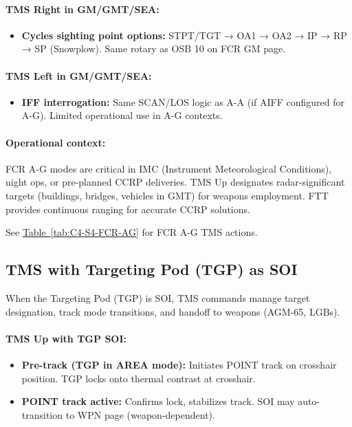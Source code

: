 \documentclass[11pt, a4paper, twoside]{report}
\newcommand{\tabref}[1]{\hyperref[#1]{Table~\ref*{#1}}}
\begin{document}
\paragraph{TMS Right in GM/GMT/SEA:}
\begin{itemize}
    \item \textbf{Cycles sighting point options:} STPT/TGT → OA1 → OA2 → IP → RP → SP (Snowplow). Same rotary as OSB 10 on FCR GM page.
\end{itemize}

\paragraph{TMS Left in GM/GMT/SEA:}
\begin{itemize}
    \item \textbf{IFF interrogation:} Same SCAN/LOS logic as A-A (if AIFF configured for A-G). Limited operational use in A-G contexts.
\end{itemize}

\paragraph{Operational context:}
FCR A-G modes are critical in IMC (Instrument Meteorological Conditions), night ops, or pre-planned CCRP deliveries. TMS Up designates radar-significant targets (buildings, bridges, vehicles in GMT) for weapons employment. FTT provides continuous ranging for accurate CCRP solutions.

See \tabref{tab:C4-S4-FCR-AG} for FCR A-G TMS actions.

\subsection{TMS with Targeting Pod (TGP) as SOI}
\label{sec:C4-S4-S2}

When the Targeting Pod (TGP) is SOI, TMS commands manage target designation, track mode transitions, and handoff to weapons (AGM-65, LGBs).

\paragraph{TMS Up with TGP SOI:}
\begin{itemize}
    \item \textbf{Pre-track (TGP in AREA mode):} Initiates POINT track on crosshair position. TGP locks onto thermal contrast at crosshair.
    \item \textbf{POINT track active:} Confirms lock, stabilizes track. SOI may auto-transition to WPN page (weapon-dependent).
\end{itemize}
\end{document}
